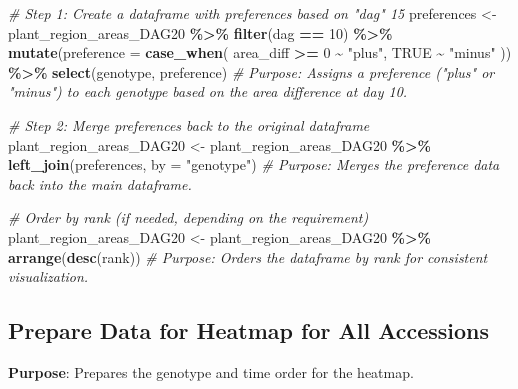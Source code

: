 \documentclass[
  11pt,
]{article}
\newenvironment{Shaded}{\begin{snugshade}}{\end{snugshade}}
\newcommand{\AttributeTok}[1]{\textcolor[rgb]{0.13,0.29,0.53}{#1}}
\newcommand{\CommentTok}[1]{\textcolor[rgb]{0.56,0.35,0.01}{\textit{#1}}}
\newcommand{\ConstantTok}[1]{\textcolor[rgb]{0.56,0.35,0.01}{#1}}
\newcommand{\DecValTok}[1]{\textcolor[rgb]{0.00,0.00,0.81}{#1}}
\newcommand{\FunctionTok}[1]{\textcolor[rgb]{0.13,0.29,0.53}{\textbf{#1}}}
\newcommand{\NormalTok}[1]{#1}
\newcommand{\OtherTok}[1]{\textcolor[rgb]{0.56,0.35,0.01}{#1}}
\newcommand{\SpecialCharTok}[1]{\textcolor[rgb]{0.81,0.36,0.00}{\textbf{#1}}}
\newcommand{\StringTok}[1]{\textcolor[rgb]{0.31,0.60,0.02}{#1}}
\begin{document}
\begin{Shaded}
\begin{Highlighting}[]
\CommentTok{\# Step 1: Create a dataframe with preferences based on "dag" 15}
\NormalTok{preferences }\OtherTok{\textless{}{-}}\NormalTok{ plant\_region\_areas\_DAG20 }\SpecialCharTok{\%\textgreater{}\%}
  \FunctionTok{filter}\NormalTok{(dag }\SpecialCharTok{==} \DecValTok{10}\NormalTok{) }\SpecialCharTok{\%\textgreater{}\%}
  \FunctionTok{mutate}\NormalTok{(}\AttributeTok{preference =} \FunctionTok{case\_when}\NormalTok{(}
\NormalTok{    area\_diff }\SpecialCharTok{\textgreater{}=} \DecValTok{0} \SpecialCharTok{\textasciitilde{}} \StringTok{"plus"}\NormalTok{,}
    \ConstantTok{TRUE} \SpecialCharTok{\textasciitilde{}} \StringTok{"minus"}
\NormalTok{  )) }\SpecialCharTok{\%\textgreater{}\%}
  \FunctionTok{select}\NormalTok{(genotype, preference)}
\CommentTok{\# Purpose: Assigns a preference ("plus" or "minus") to each genotype based on the area difference at day 10.}

\CommentTok{\# Step 2: Merge preferences back to the original dataframe}
\NormalTok{plant\_region\_areas\_DAG20 }\OtherTok{\textless{}{-}}\NormalTok{ plant\_region\_areas\_DAG20 }\SpecialCharTok{\%\textgreater{}\%}
  \FunctionTok{left\_join}\NormalTok{(preferences, }\AttributeTok{by =} \StringTok{"genotype"}\NormalTok{)}
\CommentTok{\# Purpose: Merges the preference data back into the main dataframe.}

\CommentTok{\# Order by rank (if needed, depending on the requirement)}
\NormalTok{plant\_region\_areas\_DAG20 }\OtherTok{\textless{}{-}}\NormalTok{ plant\_region\_areas\_DAG20 }\SpecialCharTok{\%\textgreater{}\%}
  \FunctionTok{arrange}\NormalTok{(}\FunctionTok{desc}\NormalTok{(rank))}
\CommentTok{\# Purpose: Orders the dataframe by rank for consistent visualization.}
\end{Highlighting}
\end{Shaded}

\subsection{Prepare Data for Heatmap for All
Accessions}\label{prepare-data-for-heatmap-for-all-accessions}

\textbf{Purpose}: Prepares the genotype and time order for the heatmap.

\begin{Shaded}
\end{Shaded}
\end{document}
